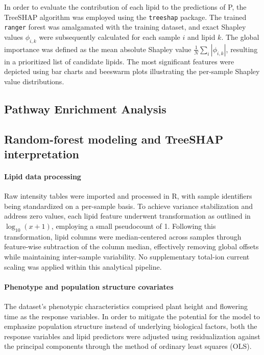 \documentclass[10pt,letterpaper]{article}
\begin{document}
In order to evaluate the contribution of each lipid to the predictions of P, the TreeSHAP algorithm was employed using the \texttt{treeshap} package. The trained \texttt{ranger} forest was amalgamated with the training dataset, and exact Shapley values $\phi_{i,k}$ were subsequently calculated for each sample $i$ and lipid $k$. The global importance was defined as the mean absolute Shapley value $\frac{1}{N}\sum_i|\phi_{i,k}|$, resulting in a prioritized list of candidate lipids. The most significant features were depicted using bar charts and beeswarm plots illustrating the per-sample Shapley value distributions.

\subsection*{Pathway Enrichment Analysis}


\subsection*{Random-forest modeling and TreeSHAP interpretation}
\paragraph{Lipid data processing}
Raw intensity tables were imported and processed in R, with sample identifiers being standardized on a per-sample basis. To achieve variance stabilization and address zero values, each lipid feature underwent transformation as outlined in \(\log_{10}(x + 1)\), employing a small pseudocount of 1. Following this transformation, lipid columns were median-centered across samples through feature-wise subtraction of the column median, effectively removing global offsets while maintaining inter-sample variability. No supplementary total-ion current scaling was applied within this analytical pipeline.

\paragraph{Phenotype and population structure covariates}
The dataset's phenotypic characteristics comprised plant height and flowering time as the response variables. In order to mitigate the potential for the model to emphasize population structure instead of underlying biological factors, both the response variables and lipid predictors were adjusted using residualization against the principal components through the method of ordinary least squares (OLS).
\end{document}
